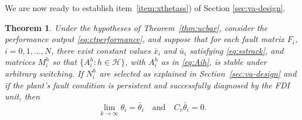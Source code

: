 \documentclass[letterpaper, 10 pt, conference]{ieeeconf}
\newcommand{\Hset}{\mathcal{H}}
\newtheorem{thm}{Theorem}
\begin{document}
We are now ready to establish item~\ref{item:xthetass})
of Section \ref{sec:va-design}.
\begin{thm}
  \label{thm:VAstateconv}
    Under the hypotheses of Theorem~\ref{thm:ucbar}, consider the
    performance output \eqref{eq:ctperformance}, and
suppose that for each fault matrix $F_i$, $i=0,1,\ldots,N$, there
    exist constant values $\bar x_i$ and $\bar u_i$ satisfying
    \eqref{eq:sstrack}, and matrices $M_i^h$ so that $\{A_i^h :
    h\in\Hset\}$, with $A_i^h$ as in \eqref{eq:Aih}, is stable under
    arbitrary switching. If $N_i^h$ are selected as explained in
    Section~\ref{sec:va-design} and if the plant's fault condition is
    persistent and successfully diagnosed by the FDI unit, then
    \begin{equation}
      \label{eq:limtheta}
      \lim_{k\to\infty} \theta_i = \bar\theta_i\quad\text{and}\quad C_v\bar\theta_i = 0.
    \end{equation}
\end{thm}
\end{document}
